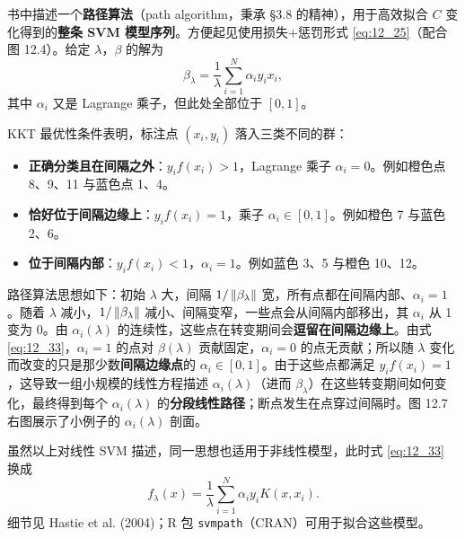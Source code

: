 \begin{remark}[路径算法的思想]
书中描述一个\textbf{路径算法}（path algorithm，秉承 §3.8 的精神），用于高效拟合 $C$ 变化得到的\textbf{整条 SVM 模型序列}。方便起见使用损失+惩罚形式 \ref{eq:12_25}（配合图 12.4）。给定 $\lambda$，$\beta$ 的解为
\begin{equation}
\beta_\lambda = \frac{1}{\lambda}\sum_{i=1}^{N}\alpha_i y_i x_i, \label{eq:12_33}
\end{equation}
其中 $\alpha_i$ 又是 Lagrange 乘子，但此处全部位于 $[0,1]$。
\end{remark}

KKT 最优性条件表明，标注点 $(x_i,y_i)$ 落入三类不同的群：

\begin{itemize}
\item \textbf{正确分类且在间隔之外}：$y_i f(x_i) > 1$，Lagrange 乘子 $\alpha_i = 0$。例如橙色点 8、9、11 与蓝色点 1、4。
\item \textbf{恰好位于间隔边缘上}：$y_i f(x_i) = 1$，乘子 $\alpha_i\in[0,1]$。例如橙色 7 与蓝色 2、6。
\item \textbf{位于间隔内部}：$y_i f(x_i) < 1$，$\alpha_i = 1$。例如蓝色 3、5 与橙色 10、12。
\end{itemize}

\begin{remark}[路径的演化]
路径算法思想如下：初始 $\lambda$ 大，间隔 $1/\left\lVert\beta_\lambda\right\rVert$ 宽，所有点都在间隔内部、$\alpha_i=1$。随着 $\lambda$ 减小，$1/\left\lVert\beta_\lambda\right\rVert$ 减小、间隔变窄，一些点会从间隔内部移出，其 $\alpha_i$ 从 1 变为 0。由 $\alpha_i(\lambda)$ 的连续性，这些点在转变期间会\textbf{逗留在间隔边缘上}。由式 \ref{eq:12_33}，$\alpha_i=1$ 的点对 $\beta(\lambda)$ 贡献固定，$\alpha_i=0$ 的点无贡献；所以随 $\lambda$ 变化而改变的只是那少数\textbf{间隔边缘点}的 $\alpha_i\in[0,1]$。由于这些点都满足 $y_i f(x_i)=1$，这导致一组小规模的线性方程描述 $\alpha_i(\lambda)$（进而 $\beta_\lambda$）在这些转变期间如何变化，最终得到每个 $\alpha_i(\lambda)$ 的\textbf{分段线性路径}；断点发生在点穿过间隔时。图 12.7 右图展示了小例子的 $\alpha_i(\lambda)$ 剖面。

虽然以上对线性 SVM 描述，同一思想也适用于非线性模型，此时式 \ref{eq:12_33} 换成
\begin{equation}
f_\lambda(x) = \frac{1}{\lambda}\sum_{i=1}^{N}\alpha_i y_i K(x,x_i). \label{eq:12_34}
\end{equation}
细节见 Hastie et al. (2004)；R 包 \texttt{svmpath}（CRAN）可用于拟合这些模型。
\end{remark}

